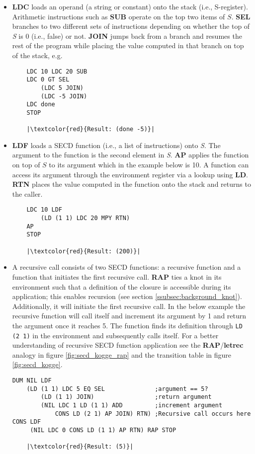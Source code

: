 \documentclass[a4paper,12pt,twoside,openright]{report}
\theoremstyle{definition}
\begin{document}
\begin{itemize}
    \item \textbf{LDC} loads an operand (a string or constant) onto the stack (i.e., S-register). Arithmetic instructions such as \textbf{SUB} operate on the top two items of $S$. \textbf{SEL} branches to two different sets of instructions depending on whether the top of \textit{S} is 0 (i.e., false) or not. \textbf{JOIN} jumps back from a branch and resumes the rest of the program while placing the value computed in that branch on top of the stack, e.g.
\begin{verbatim}
    LDC 10 LDC 20 SUB
    LDC 0 GT SEL
        (LDC 5 JOIN)
        (LDC -5 JOIN)
    LDC done
    STOP
    
    |\textcolor{red}{Result: (done -5)}|
\end{verbatim}
    \item \textbf{LDF} loads a SECD function (i.e., a list of instructions) onto \textit{S}. The argument to the function is the second element in \textit{S}. \textbf{AP} applies the function on top of $S$ to its argument which in the example below is 10. A function can access its argument through the environment register via a lookup using \textbf{LD}. \textbf{RTN} places the value computed in the function onto the stack and returns to the caller.
\begin{verbatim}
    LDC 10 LDF
        (LD (1 1) LDC 20 MPY RTN)
    AP
    STOP

    |\textcolor{red}{Result: (200)}|
\end{verbatim}

    \item A recursive call consists of two SECD functions: a recursive function and a function that initiates the first recursive call. \textbf{RAP} ties a knot in its environment such that a definition of the closure is accessible during its application; this enables recursion (see section \ref{ssubsec:background_knot}). Additionally, it will initiate the first recursive call. In the below example the recursive function will call itself and increment its argument by 1 and return the argument once it reaches 5. The function finds its definition through \texttt{LD (2 1)} in the environment and subsequently calls itself. For a better understanding of recursive SECD function application see the \textbf{RAP}/\textbf{letrec} analogy in figure \ref{fig:secd_kogge_rap} and the transition table in figure \ref{fig:secd_kogge}.
\begin{verbatim}
DUM NIL LDF
    (LD (1 1) LDC 5 EQ SEL              ;argument == 5?
        (LD (1 1) JOIN)                 ;return argument
        (NIL LDC 1 LD (1 1) ADD         ;increment argument
            CONS LD (2 1) AP JOIN) RTN) ;Recursive call occurs here
CONS LDF
     (NIL LDC 0 CONS LD (1 1) AP RTN) RAP STOP

    |\textcolor{red}{Result: (5)}|
\end{verbatim}
\end{itemize}
\end{document}
